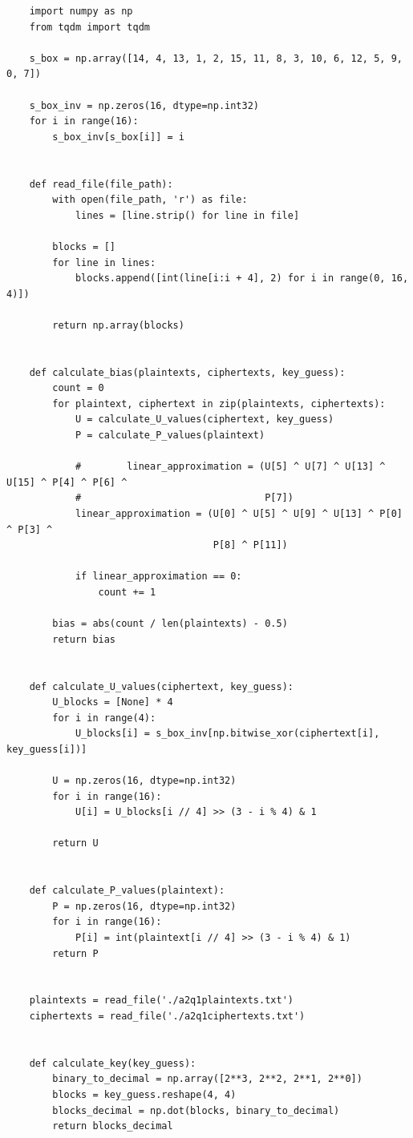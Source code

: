 \documentclass[11pt]{article}
\begin{document}
\begin{verbatim}
    import numpy as np
    from tqdm import tqdm
    
    s_box = np.array([14, 4, 13, 1, 2, 15, 11, 8, 3, 10, 6, 12, 5, 9, 0, 7])
    
    s_box_inv = np.zeros(16, dtype=np.int32)
    for i in range(16):
        s_box_inv[s_box[i]] = i
    
    
    def read_file(file_path):
        with open(file_path, 'r') as file:
            lines = [line.strip() for line in file]
    
        blocks = []
        for line in lines:
            blocks.append([int(line[i:i + 4], 2) for i in range(0, 16, 4)])
    
        return np.array(blocks)
    
    
    def calculate_bias(plaintexts, ciphertexts, key_guess):
        count = 0
        for plaintext, ciphertext in zip(plaintexts, ciphertexts):
            U = calculate_U_values(ciphertext, key_guess)
            P = calculate_P_values(plaintext)
    
            #        linear_approximation = (U[5] ^ U[7] ^ U[13] ^ U[15] ^ P[4] ^ P[6] ^
            #                                P[7])
            linear_approximation = (U[0] ^ U[5] ^ U[9] ^ U[13] ^ P[0] ^ P[3] ^
                                    P[8] ^ P[11])
    
            if linear_approximation == 0:
                count += 1
    
        bias = abs(count / len(plaintexts) - 0.5)
        return bias
    
    
    def calculate_U_values(ciphertext, key_guess):
        U_blocks = [None] * 4
        for i in range(4):
            U_blocks[i] = s_box_inv[np.bitwise_xor(ciphertext[i], key_guess[i])]
    
        U = np.zeros(16, dtype=np.int32)
        for i in range(16):
            U[i] = U_blocks[i // 4] >> (3 - i % 4) & 1
    
        return U
    
    
    def calculate_P_values(plaintext):
        P = np.zeros(16, dtype=np.int32)
        for i in range(16):
            P[i] = int(plaintext[i // 4] >> (3 - i % 4) & 1)
        return P
    
    
    plaintexts = read_file('./a2q1plaintexts.txt')
    ciphertexts = read_file('./a2q1ciphertexts.txt')
    
    
    def calculate_key(key_guess):
        binary_to_decimal = np.array([2**3, 2**2, 2**1, 2**0])
        blocks = key_guess.reshape(4, 4)
        blocks_decimal = np.dot(blocks, binary_to_decimal)
        return blocks_decimal
    

\end{verbatim}
\end{document}
